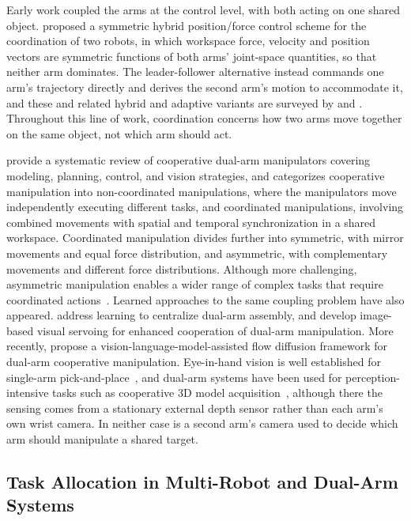 Early work coupled the arms at the control level, with both acting on one shared object.
\citet{uchiyama1988symmetric} proposed a symmetric hybrid position/force control scheme for the
coordination of two robots, in which workspace force, velocity and position vectors are symmetric
functions of both arms' joint-space quantities, so that neither arm dominates. The leader-follower
alternative instead commands one arm's trajectory directly and derives the second arm's motion to
accommodate it, and these and related hybrid and adaptive variants are surveyed by
\citet{caccavale2025cooperative} and \citet{smith2012dual}. Throughout this line of work,
coordination concerns how two arms move together on the same object, not which arm should
act.

\citet{abbas2023systematic} provide a systematic review of cooperative dual-arm manipulators
covering modeling, planning, control, and vision strategies, and \citet{makris2021cooperative}
categorizes cooperative manipulation into non-coordinated manipulations, where the manipulators move
independently executing different tasks, and coordinated manipulations, involving combined movements
with spatial and temporal synchronization in a shared workspace. Coordinated manipulation divides
further into symmetric, with mirror movements and equal force distribution, and asymmetric, with
complementary movements and different force distributions. Although more challenging, asymmetric
manipulation enables a wider range of complex tasks that require coordinated
actions~\citep{surya2025iapf}. Learned approaches to the same coupling problem have also appeared. \citet{alles2022learning} address learning to centralize dual-arm assembly, and \citet{zhang2025imagebased} develop image-based visual servoing for enhanced cooperation of dual-arm manipulation. More recently, \citet{chen2026vlmsfd} propose a vision-language-model-assisted flow diffusion framework for dual-arm cooperative manipulation. Eye-in-hand vision is well established for single-arm pick-and-place~\citep{nguyen2025vision}, and dual-arm systems have been used for perception-intensive tasks such as cooperative 3D model acquisition~\citep{kobayashi2022obtaining}, although there the sensing comes from a stationary external depth sensor rather than each arm's own wrist camera. In neither case is a second arm's camera used to decide which arm should manipulate a shared target.

\subsection{Task Allocation in Multi-Robot and Dual-Arm Systems}\label{subsec:lit_allocation}

